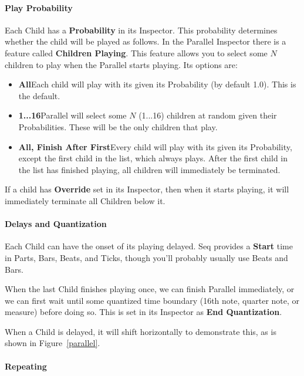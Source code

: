 \documentclass[twoside,10pt]{article}
\begin{document}
\paragraph{Play Probability}

Each Child has a {\bf Probability} in its Inspector.  This probability determines whether the child will be played as follows.  In the Parallel Inspector there is a feature called {\bf Children Playing}.  This feature allows you to select some \(N\) children to play when the Parallel starts playing.  Its options are:

\begin{itemize}
\item {\bf All}\quad Each child will play with its given its Probability (by default 1.0).  This is the default.
\item {\bf 1...16}\quad Parallel will select some \(N\) (1...16) children at random given their Probabilities.  These will be the only children that play.
\item {\bf All, Finish After First}\quad Every child will play with its given its Probability, except the first child in the list, which always plays.  After the first child in the list has finished playing, all children will immediately be terminated.
\end{itemize}

If a child has {\bf Override} set in its Inspector, then when it starts playing, it will immediately terminate all Children below it.  

\paragraph{Delays and Quantization}

Each Child can have the onset of its playing delayed.  Seq provides a {\bf Start} time in Parts, Bars, Beats, and Ticks, though you'll probably usually use Beats and Bars.

When the last Child finishes playing once, we can finish Parallel immediately, or we can first wait until some quantized time boundary (16th note, quarter note, or measure) before doing so.  This is set in its Inspector as {\bf End Quantization}.

When a Child is delayed, it will shift horizontally to demonstrate this, as is shown in Figure~\ref{parallel}.

\paragraph{Repeating}
\end{document}
